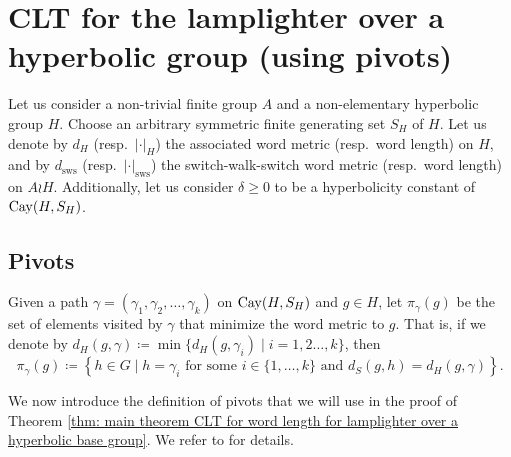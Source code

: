 \section{CLT for the lamplighter over a hyperbolic group (using pivots)}
Let us consider a non-trivial finite group $A$ and a non-elementary hyperbolic group $H$. Choose an arbitrary symmetric finite generating set $S_H$ of $H$. Let us denote by $d_H$ (resp.\ $|\cdot |_H$) the associated word metric (resp.\ word length) on $H$, and by $d_{\mathrm{sws}}$ (resp.\ $|\cdot|_{\mathrm{sws}}$) the switch-walk-switch word metric (resp.\ word length) on $A\wr H$. Additionally, let us consider $\delta\ge 0$ to be a hyperbolicity constant of $\mathrm{Cay}(H,S_H)$.

\subsection{Pivots}
\begin{defin}
	Given a path $\gamma=(\gamma_1,\gamma_2,\ldots,\gamma_k)$ on $\mathrm{Cay}(H,S_H)$ and $g\in H$, let $\pi_{\gamma}(g)$ be the set of elements visited by $\gamma$ that minimize the word metric to $g$. That is, if we denote by $d_H(g,\gamma)\coloneqq \min \{ d_H(g,\gamma_i)\mid i=1,2\ldots,k \}$, then
	\begin{equation}
		\pi_{\gamma}(g)\coloneqq \left\{ h\in G \mid  h=
		\gamma_i \text{ for some }i\in \{1,\ldots,k\}\text{ and }  d_S(g,h)= d_H(g,\gamma) \right \}.
	\end{equation}
\end{defin}

We now introduce the definition of pivots that we will use in the proof of Theorem \ref{thm: main theorem CLT for word length for lamplighter over a hyperbolic base group}. We refer to \cite[Section 4A]{Gouezel2022} for details.

